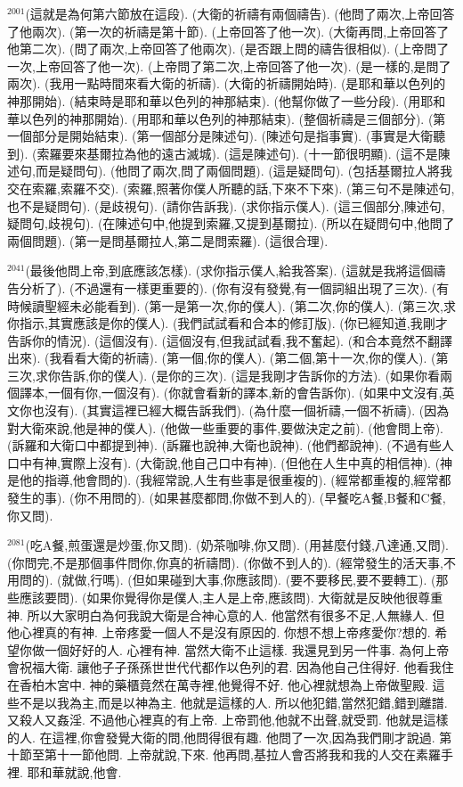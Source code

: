 \documentclass{book}
\begin{document}
$^{2001}$(這就是為何第六節放在這段).
(大衛的祈禱有兩個禱告).
(他問了兩次,上帝回答了他兩次).
(第一次的祈禱是第十節).
(上帝回答了他一次).
(大衛再問,上帝回答了他第二次).
(問了兩次,上帝回答了他兩次).
(是否跟上問的禱告很相似).
(上帝問了一次,上帝回答了他一次).
(上帝問了第二次,上帝回答了他一次).
(是一樣的,是問了兩次).
(我用一點時間來看大衛的祈禱).
(大衛的祈禱開始時).
(是耶和華以色列的神那開始).
(結束時是耶和華以色列的神那結束).
(他幫你做了一些分段).
(用耶和華以色列的神那開始).
(用耶和華以色列的神那結束).
(整個祈禱是三個部分).
(第一個部分是開始結束).
(第一個部分是陳述句).
(陳述句是指事實).
(事實是大衛聽到).
(索羅要來基爾拉為他的遠古滅城).
(這是陳述句).
(十一節很明顯).
(這不是陳述句,而是疑問句).
(他問了兩次,問了兩個問題).
(這是疑問句).
(包括基爾拉人將我交在索羅,索羅不交).
(索羅,照著你僕人所聽的話,下來不下來).
(第三句不是陳述句,也不是疑問句).
(是歧視句).
(請你告訴我).
(求你指示僕人).
(這三個部分,陳述句,疑問句,歧視句).
(在陳述句中,他提到索羅,又提到基爾拉).
(所以在疑問句中,他問了兩個問題).
(第一是問基爾拉人,第二是問索羅).
(這很合理).

$^{2041}$(最後他問上帝,到底應該怎樣).
(求你指示僕人,給我答案).
(這就是我將這個禱告分析了).
(不過還有一樣更重要的).
(你有沒有發覺,有一個詞組出現了三次).
(有時候讀聖經未必能看到).
(第一是第一次,你的僕人).
(第二次,你的僕人).
(第三次,求你指示,其實應該是你的僕人).
(我們試試看和合本的修訂版).
(你已經知道,我剛才告訴你的情況).
(這個沒有).
(這個沒有,但我試試看,我不奮起).
(和合本竟然不翻譯出來).
(我看看大衛的祈禱).
(第一個,你的僕人).
(第二個,第十一次,你的僕人).
(第三次,求你告訴,你的僕人).
(是你的三次).
(這是我剛才告訴你的方法).
(如果你看兩個譯本,一個有你,一個沒有).
(你就會看新的譯本,新的會告訴你).
(如果中文沒有,英文你也沒有).
(其實這裡已經大概告訴我們).
(為什麼一個祈禱,一個不祈禱).
(因為對大衛來說,他是神的僕人).
(他做一些重要的事件,要做決定之前).
(他會問上帝).
(訴羅和大衛口中都提到神).
(訴羅也說神,大衛也說神).
(他們都說神).
(不過有些人口中有神,實際上沒有).
(大衛說,他自己口中有神).
(但他在人生中真的相信神).
(神是他的指導,他會問的).
(我經常說,人生有些事是很重複的).
(經常都重複的,經常都發生的事).
(你不用問的).
(如果甚麼都問,你做不到人的).
(早餐吃A餐,B餐和C餐,你又問).

$^{2081}$(吃A餐,煎蛋還是炒蛋,你又問).
(奶茶咖啡,你又問).
(用甚麼付錢,八達通,又問).
(你問完,不是那個事件問你,你真的祈禱問).
(你做不到人的).
(經常發生的活天事,不用問的).
(就做,行嗎).
(但如果碰到大事,你應該問).
(要不要移民,要不要轉工).
(那些應該要問).
(如果你覺得你是僕人,主人是上帝,應該問).
大衛就是反映他很尊重神.
所以大家明白為何我說大衛是合神心意的人.
他當然有很多不足,人無緣人.
但他心裡真的有神.
上帝疼愛一個人不是沒有原因的.
你想不想上帝疼愛你?想的.
希望你做一個好好的人.
心裡有神.
當然大衛不止這樣.
我還見到另一件事.
為何上帝會祝福大衛.
讓他子子孫孫世世代代都作以色列的君.
因為他自己住得好.
他看我住在香柏木宮中.
神的藥櫃竟然在萬寺裡,他覺得不好.
他心裡就想為上帝做聖殿.
這些不是以我為主,而是以神為主.
他就是這樣的人.
所以他犯錯,當然犯錯,錯到離譜.
又殺人又姦淫.
不過他心裡真的有上帝.
上帝罰他,他就不出聲,就受罰.
他就是這樣的人.
在這裡,你會發覺大衛的問,他問得很有趣.
他問了一次,因為我們剛才說過.
第十節至第十一節他問.
上帝就說,下來.
他再問,基拉人會否將我和我的人交在素羅手裡.
耶和華就說,他會.
\end{document}
